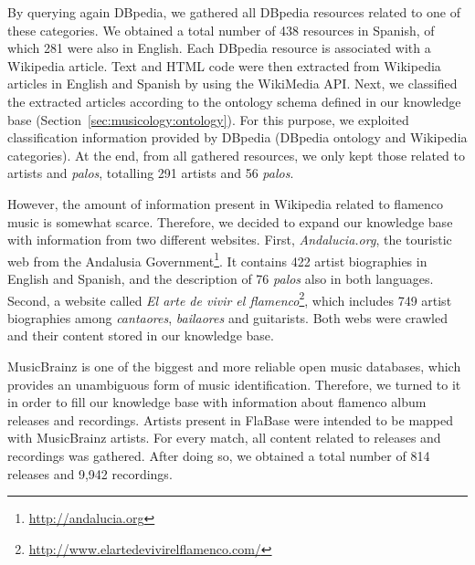 By querying again DBpedia, we gathered all DBpedia resources related to one of these categories. We obtained a total number of 438 resources in Spanish, of which 281 were also in English. Each DBpedia resource is associated with a Wikipedia article. Text and HTML code were then extracted from Wikipedia articles in English and Spanish by using the WikiMedia API. 
Next, we classified the extracted articles according to the ontology schema defined in our knowledge base (Section~\ref{sec:musicology:ontology}). For this purpose, we exploited classification information provided by DBpedia (DBpedia ontology and Wikipedia categories). At the end, from all gathered resources, we only kept those related to artists and \textit{palos}, totalling  291 artists and 56 \textit{palos}.

However, the amount of information present in Wikipedia related to flamenco music is somewhat scarce. Therefore, we decided to expand our knowledge base with information from two different websites. First, \textit{Andalucia.org}, the touristic web from the Andalusia Government\footnote{\url{http://andalucia.org}}. It contains 422 artist biographies in English and Spanish, and the description of 76 \textit{palos} also in both languages. Second, a website called \textit{El arte de vivir el flamenco}\footnote{\url{http://www.elartedevivirelflamenco.com/}}, which includes 749 artist biographies among \textit{cantaores}, \textit{bailaores} and guitarists. Both webs were crawled and their content stored in our knowledge base. %

MusicBrainz is one of the biggest and more reliable open music databases, which provides an unambiguous form of music identification. Therefore, we turned to it in order to fill our knowledge base with information about flamenco album releases and recordings. Artists present in FlaBase were intended to be mapped with MusicBrainz artists. For every match, all content related to releases and recordings was gathered. After doing so, we obtained a total number of 814 releases and 9,942 recordings. 

